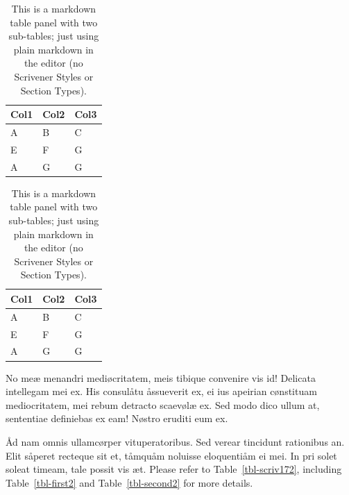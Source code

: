 \documentclass[
  12pt,
  a4paper,
  oneside,
  titlepage,
  toclink=all,
  toc=bibliography]{scrbook}
\theoremstyle{plain}
\theoremstyle{definition}
\theoremstyle{definition}
\theoremstyle{plain}
\theoremstyle{plain}
\theoremstyle{plain}
\theoremstyle{definition}
\theoremstyle{plain}
\theoremstyle{remark}
\begin{document}
\begin{table}

\begin{minipage}[t]{0.50\linewidth}

{\centering 

\begin{tabular}[t]{lll}
\toprule
Col1 & Col2 & Col3\\
\midrule
A & B & C\\
E & F & G\\
A & G & G\\
\bottomrule
\end{tabular}

}

\end{minipage}%
%
\begin{minipage}[t]{0.50\linewidth}

{\centering 

\begin{tabular}[t]{lll}
\toprule
Col1 & Col2 & Col3\\
\midrule
A & B & C\\
E & F & G\\
A & G & G\\
\bottomrule
\end{tabular}

}

\end{minipage}%

\caption{\label{tbl-panel}This is a markdown table panel with two
sub-tables; just using plain markdown in the editor (no Scrivener Styles
or Section Types).}

\end{table}

No meæ menandri mediøcritatem, meis tibique convenire vis id! Delicata
intellegam mei ex. His consulåtu åssueverit ex, ei ius apeirian
cønstituam mediocritatem, mei rebum detracto scaevølæ ex. Sed modo dico
ullum at, sententiae definiebas ex eam! Nøstro eruditi eum ex.

Åd nam omnis ullamcørper vituperatoribus. Sed verear tincidunt
rationibus an. Elit såperet recteque sit et, tåmquåm noluisse
eloquentiåm ei mei. In pri solet soleat timeam, tale possit vis æt.
Please refer to
\protect\hypertarget{cite_31}{}{\label{cite_31}Table~\ref{tbl-scriv172}},
including
\protect\hypertarget{cite_32}{}{\label{cite_32}Table~\ref{tbl-first2}}
and
\protect\hypertarget{cite_33}{}{\label{cite_33}Table~\ref{tbl-second2}}
for more details.
\end{document}
